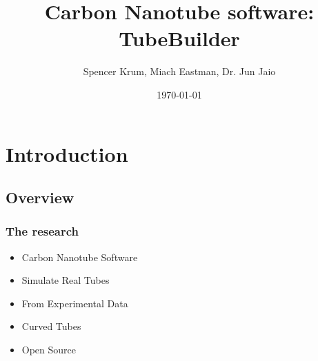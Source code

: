 \documentclass{beamer}
\title{Carbon Nanotube software: TubeBuilder}
\date{\today}
\author{Spencer Krum, Miach Eastman, Dr. Jun Jaio}
\begin{document}
\frame{\titlepage}

\section{Introduction}
\subsection{Overview}
\frame 
{
    \frametitle{The research}
    \begin{itemize}
        \item Carbon Nanotube Software
        \item Simulate Real Tubes
        \item From Experimental Data
        \item Curved Tubes
        \item Open Source
    \end{itemize}
}
\end{document}
